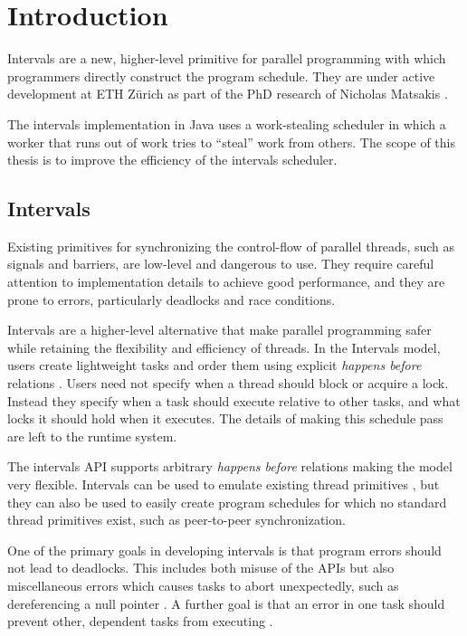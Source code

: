 
\chapter{Introduction}
\label{chap:introduction}

Intervals \cite{Matsakis2009b} are a new, higher-level primitive for
parallel programming with which programmers directly construct the
program schedule. They are under active development at ETH Zürich as
part of the PhD research of Nicholas Matsakis \cite{Matsakis2010}.

The intervals implementation in Java uses a work-stealing scheduler in
which a worker that runs out of work tries to ``steal'' work from
others. The scope of this thesis is to improve the efficiency of the
intervals scheduler.

\section{Intervals}
\label{sec:intro-intervals}

Existing primitives for synchronizing the control-flow of parallel
threads, such as signals and barriers, are low-level and dangerous to
use. They require careful attention to implementation details to
achieve good performance, and they are prone to errors, particularly
deadlocks and race conditions.

Intervals are a higher-level alternative that make parallel
programming safer while retaining the flexibility and efficiency of
threads. In the Intervals model, users create lightweight tasks and
order them using explicit \emph{happens before} relations
\cite{Lamport1978}. Users need not specify when a thread should block
or acquire a lock. Instead they specify when a task should execute
relative to other tasks, and what locks it should hold when it
executes. The details of making this schedule pass are left to the
runtime system.

The intervals API supports arbitrary \emph{happens before} relations
making the model very flexible. Intervals can be used to emulate
existing thread primitives \cite{Matsakis2009b}, but they can also be
used to easily create program schedules for which no standard thread
primitives exist, such as peer-to-peer synchronization.

One of the primary goals in developing intervals is that program
errors should not lead to deadlocks. This includes both misuse of the
APIs but also miscellaneous errors which causes tasks to abort
unexpectedly, such as dereferencing a null pointer
\cite{Matsakis2009}. A further goal is that an error in one task
should prevent other, dependent tasks from executing
\cite{Matsakis2010a}.

